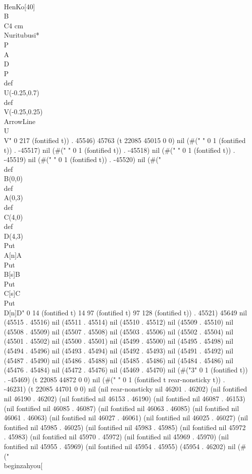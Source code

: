    \\HenKo[40]\\B\\C{4 cm}
   \\Nuritubusi*{\\P\\A\\D\\P}
   \\def\\U{(-0.25,0.7)}
   \\def\\V{(-0.25,0.25)}
   \\ArrowLine\\U\\V" 0 217 (fontified t)) . 45546) 45763 (t 22085 45015 0 0) nil (#("
" 0 1 (fontified t)) . -45517) nil (#(" " 0 1 (fontified t)) . -45518) nil (#(" " 0 1 (fontified t)) . -45519) nil (#(" " 0 1 (fontified t)) . -45520) nil (#("\\def\\B{(0,0)}
   \\def\\A{(0,3)}
   \\def\\C{(4,0)}
   \\def\\D{(4,3)}
   \\Put\\A[n]{A}
   \\Put\\B[s]{B}
   \\Put\\C[s]{C}
   \\Put\\D[n]{D}" 0 14 (fontified t) 14 97 (fontified t) 97 128 (fontified t)) . 45521) 45649 nil (45515 . 45516) nil (45511 . 45514) nil (45510 . 45512) nil (45509 . 45510) nil (45508 . 45509) nil (45507 . 45508) nil (45503 . 45506) nil (45502 . 45504) nil (45501 . 45502) nil (45500 . 45501) nil (45499 . 45500) nil (45495 . 45498) nil (45494 . 45496) nil (45493 . 45494) nil (45492 . 45493) nil (45491 . 45492) nil (45487 . 45490) nil (45486 . 45488) nil (45485 . 45486) nil (45484 . 45486) nil (45476 . 45484) nil (45472 . 45476) nil (45469 . 45470) nil (#("3" 0 1 (fontified t)) . -45469) (t 22085 44872 0 0) nil (#("
" 0 1 (fontified t rear-nonsticky t)) . -46231) (t 22085 44701 0 0) nil (nil rear-nonsticky nil 46201 . 46202) (nil fontified nil 46190 . 46202) (nil fontified nil 46153 . 46190) (nil fontified nil 46087 . 46153) (nil fontified nil 46085 . 46087) (nil fontified nil 46063 . 46085) (nil fontified nil 46061 . 46063) (nil fontified nil 46027 . 46061) (nil fontified nil 46025 . 46027) (nil fontified nil 45985 . 46025) (nil fontified nil 45983 . 45985) (nil fontified nil 45972 . 45983) (nil fontified nil 45970 . 45972) (nil fontified nil 45969 . 45970) (nil fontified nil 45955 . 45969) (nil fontified nil 45954 . 45955) (45954 . 46202) nil (#(" \\begin{zahyou}[%
